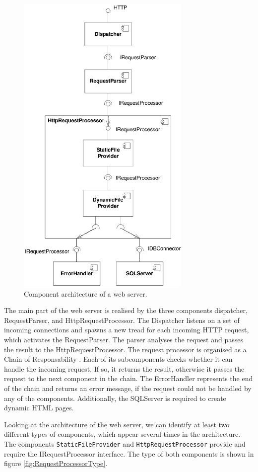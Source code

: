 \begin{figure}[htbp]
\centering
\includegraphics[width=3.3in]{example/WebserverComponents}
\caption{Component architecture of a web server.}
\label{fig:WebserverComponents}
\end{figure}

The main part of the web server is realised by the three components dispatcher, RequestParser, and HttpRequestProcessor. The Dispatcher listens on a set of incoming connections and spawns a new tread for each incoming HTTP request, which activates the RequestParser. The parser analyses the request and passes the result to the HttpRequestProcessor. The request processor is organised as a Chain of Responsability \cite{gamma1995a}. Each of its subcomponents checks whether it can handle the incoming request. If so, it returns the result, otherwise it passes the request to the next component in the chain. The ErrorHandler represents the end of the chain and returns an error message, if the request could not be handled by any of the components. Additionally, the SQLServer is required to create dynamic HTML pages.

Looking at the architecture of the web server, we can identify at least two different types of components, which appear several times in the architecture. The components \texttt{StaticFileProvider} and \texttt{HttpRequestProcessor} provide and require the IRequestProcessor interface. The type of both components is shown in figure \ref{fig:RequestProcessorType}.

